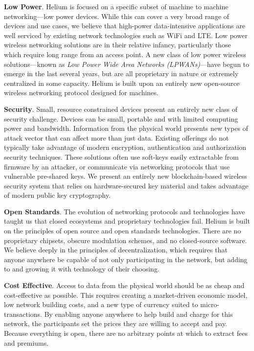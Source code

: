 \documentclass[10pt, nonatbib, nocopyrightspace, reprint]{sigplanconf}
\begin{document}
\textbf{Low Power}. Helium is focused on a specific subset of machine to machine networking---low power devices. While this can cover a very broad range of devices and use cases, we believe that high-power data-intensive applications are well serviced by existing network technologies such as WiFi and LTE\@. Low power wireless networking solutions are in their relative infancy, particularly those which require long range from an access point. A new class of low power wireless solutions---known as \emph{Low Power Wide Area Networks (LPWANs)}---have begun to emerge in the last several years, but are all proprietary in nature or extremely centralized in some capacity. Helium is built upon an entirely new open-source wireless networking protocol designed for machines.

\textbf{Security}. Small, resource constrained devices present an entirely new class of security challenge. Devices can be small, portable and with limited computing power and bandwidth. Information from the physical world presents new types of attack vector that can affect more than just data. Existing offerings do not typically take advantage of modern encryption, authentication and authorization security techniques. These solutions often use soft-keys easily extractable from firmware by an attacker, or communicate via networking protocols that use vulnerable pre-shared keys. We present an entirely new blockchain-based wireless security system that relies on hardware-secured key material and takes advantage of modern public key cryptography.

\textbf{Open Standards}. The evolution of networking protocols and technologies have taught us that closed ecosystems and proprietary technologies fail. Helium is built on the principles of open source and open standards technologies. There are no proprietary chipsets, obscure modulation schemes, and no closed-source software. We believe deeply in the principles of decentralization, which requires that anyone anywhere be capable of not only participating in the network, but adding to and growing it with technology of their choosing.

\textbf{Cost Effective}. Access to data from the physical world should be as cheap and cost-effective as possible. This requires creating a market-driven economic model, low network building costs, and a new type of currency suited to micro-transactions. By enabling anyone anywhere to help build and charge for this network, the participants set the prices they are willing to accept and pay. Because everything is open, there are no arbitrary points at which to extract fees and premiums.
\end{document}
